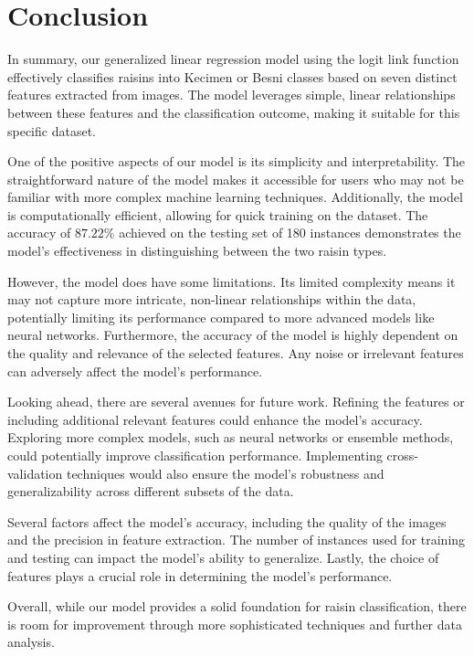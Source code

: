 \documentclass{article}
\begin{document}
\section{Conclusion}

In summary, our generalized linear regression model using the logit link function effectively classifies raisins into Kecimen or Besni classes based on seven distinct features extracted from images. The model leverages simple, linear relationships between these features and the classification outcome, making it suitable for this specific dataset.

One of the positive aspects of our model is its simplicity and interpretability. The straightforward nature of the model makes it accessible for users who may not be familiar with more complex machine learning techniques. Additionally, the model is computationally efficient, allowing for quick training on the dataset. The accuracy of $87.22\%$ achieved on the testing set of 180 instances demonstrates the model's effectiveness in distinguishing between the two raisin types.

However, the model does have some limitations. Its limited complexity means it may not capture more intricate, non-linear relationships within the data, potentially limiting its performance compared to more advanced models like neural networks. Furthermore, the accuracy of the model is highly dependent on the quality and relevance of the selected features. Any noise or irrelevant features can adversely affect the model's performance.

Looking ahead, there are several avenues for future work. Refining the features or including additional relevant features could enhance the model's accuracy. Exploring more complex models, such as neural networks or ensemble methods, could potentially improve classification performance. Implementing cross-validation techniques would also ensure the model's robustness and generalizability across different subsets of the data.

Several factors affect the model's accuracy, including the quality of the images and the precision in feature extraction. The number of instances used for training and testing can impact the model's ability to generalize. Lastly, the choice of features plays a crucial role in determining the model's performance.

Overall, while our model provides a solid foundation for raisin classification, there is room for improvement through more sophisticated techniques and further data analysis.
\end{document}
